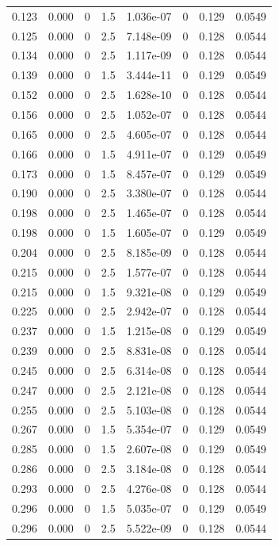 \documentclass[preview]{standalone}
\begin{document}
{{\begin{tabular}{L{1.2cm}C{1.2cm} C{0.3cm}C{0.5cm} C{1.4cm}C{1.4cm} C{1.4cm}C{1.4cm}}
  0.123  &  0.000  & 0     & 1.5 &  1.036e-07  & 0  & 0.129 &  0.0549   \\ 
  0.125  &  0.000  & 0     & 2.5 &  7.148e-09  & 0  & 0.128 &  0.0544   \\ 
  0.134  &  0.000  & 0     & 2.5 &  1.117e-09  & 0  & 0.128 &  0.0544   \\ 
  0.139  &  0.000  & 0     & 1.5 &  3.444e-11  & 0  & 0.129 &  0.0549   \\ 
  0.152  &  0.000  & 0     & 2.5 &  1.628e-10  & 0  & 0.128 &  0.0544   \\ 
  0.156  &  0.000  & 0     & 2.5 &  1.052e-07  & 0  & 0.128 &  0.0544   \\ 
  0.165  &  0.000  & 0     & 2.5 &  4.605e-07  & 0  & 0.128 &  0.0544   \\ 
  0.166  &  0.000  & 0     & 1.5 &  4.911e-07  & 0  & 0.129 &  0.0549   \\ 
  0.173  &  0.000  & 0     & 1.5 &  8.457e-07  & 0  & 0.129 &  0.0549   \\ 
  0.190  &  0.000  & 0     & 2.5 &  3.380e-07  & 0  & 0.128 &  0.0544   \\ 
  0.198  &  0.000  & 0     & 2.5 &  1.465e-07  & 0  & 0.128 &  0.0544   \\ 
  0.198  &  0.000  & 0     & 1.5 &  1.605e-07  & 0  & 0.129 &  0.0549   \\ 
  0.204  &  0.000  & 0     & 2.5 &  8.185e-09  & 0  & 0.128 &  0.0544   \\ 
  0.215  &  0.000  & 0     & 2.5 &  1.577e-07  & 0  & 0.128 &  0.0544   \\ 
  0.215  &  0.000  & 0     & 1.5 &  9.321e-08  & 0  & 0.129 &  0.0549   \\ 
  0.225  &  0.000  & 0     & 2.5 &  2.942e-07  & 0  & 0.128 &  0.0544   \\ 
  0.237  &  0.000  & 0     & 1.5 &  1.215e-08  & 0  & 0.129 &  0.0549   \\ 
  0.239  &  0.000  & 0     & 2.5 &  8.831e-08  & 0  & 0.128 &  0.0544   \\ 
  0.245  &  0.000  & 0     & 2.5 &  6.314e-08  & 0  & 0.128 &  0.0544   \\ 
  0.247  &  0.000  & 0     & 2.5 &  2.121e-08  & 0  & 0.128 &  0.0544   \\ 
  0.255  &  0.000  & 0     & 2.5 &  5.103e-08  & 0  & 0.128 &  0.0544   \\ 
  0.267  &  0.000  & 0     & 1.5 &  5.354e-07  & 0  & 0.129 &  0.0549   \\ 
  0.285  &  0.000  & 0     & 1.5 &  2.607e-08  & 0  & 0.129 &  0.0549   \\ 
  0.286  &  0.000  & 0     & 2.5 &  3.184e-08  & 0  & 0.128 &  0.0544   \\ 
  0.293  &  0.000  & 0     & 2.5 &  4.276e-08  & 0  & 0.128 &  0.0544   \\ 
  0.296  &  0.000  & 0     & 1.5 &  5.035e-07  & 0  & 0.129 &  0.0549   \\ 
  0.296  &  0.000  & 0     & 2.5 &  5.522e-09  & 0  & 0.128 &  0.0544   \\ 
\hline 
\end{tabular} 

}}
\end{document}
